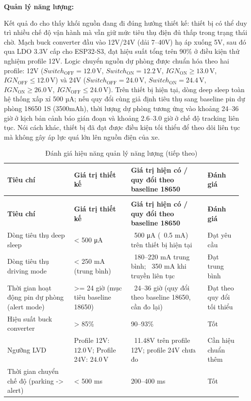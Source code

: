 \documentclass[a4paper]{extarticle}
\newcommand{\thesissettableid}[2]{%
  \renewcommand{\thetable}{#1}%
  \renewcommand{\theHtable}{#2}%
}
\begin{document}
\textbf{Quản lý năng lượng:}

Kết quả đo cho thấy khối nguồn đang đi đúng hướng thiết kế: thiết bị có
thể duy trì nhiều chế độ vận hành mà vẫn giữ mức tiêu thụ điện đủ thấp
trong trạng thái chờ. Mạch buck converter đầu vào 12V/24V (dải 7--40V)
hạ áp xuống 5V, sau đó qua LDO 3.3V cấp cho ESP32-S3, đạt hiệu suất tổng
trên 90\% ở điều kiện thử nghiệm profile 12V. Logic chuyển nguồn dự
phòng được chuẩn hóa theo hai profile:
12V (\(Switch_{\mathrm{OFF}} = 12.0\,\mathrm{V}\),
\(Switch_{\mathrm{ON}} = 12.2\,\mathrm{V}\),
\(IGN_{\mathrm{ON}} \ge 13.0\,\mathrm{V}\),
\(IGN_{\mathrm{OFF}} \le 12.0\,\mathrm{V}\)) và
24V (\(Switch_{\mathrm{OFF}} = 24.0\,\mathrm{V}\),
\(Switch_{\mathrm{ON}} = 24.4\,\mathrm{V}\),
\(IGN_{\mathrm{ON}} \ge 26.0\,\mathrm{V}\),
\(IGN_{\mathrm{OFF}} \le 24.0\,\mathrm{V}\)). Trên thiết bị hiện tại, dòng deep
sleep toàn hệ thống xấp xỉ 500 µA; nếu quy đổi cùng giả định tiêu thụ
sang baseline pin dự phòng 18650 1S (3500mAh), thời lượng dự phòng tương
ứng vào khoảng 24--36 giờ ở kịch bản cảnh báo gián đoạn và khoảng
2.6--3.0 giờ ở chế độ tracking liên tục. Nói cách khác, thiết bị đã đạt
được điều kiện tối thiểu để theo dõi liên tục mà không gây áp lực quá
lớn lên nguồn điện của xe.


{\thesissettableid{5.1}{tab-ch5-anh-gia-hieu-nang-quan-ly-nang-luong}
\def\LTcaptype{table}
\begin{longtable}{|L{0.272\linewidth}|L{0.231\linewidth}|L{0.311\linewidth}|L{0.141\linewidth}|}
\caption{Đánh giá hiệu năng quản lý năng lượng}\label{tab:ch5-anh-gia-hieu-nang-quan-ly-nang-luong}\\
\hline \textbf{Tiêu chí} & \textbf{Giá trị thiết kế} & \textbf{Giá trị hiện có / quy đổi theo baseline
18650} & \textbf{Đánh giá} \\
\hline
\endfirsthead
\caption[]{Đánh giá hiệu năng quản lý năng lượng (tiếp theo)}\\
\hline \textbf{Tiêu chí} & \textbf{Giá trị thiết kế} & \textbf{Giá trị hiện có / quy đổi theo baseline
18650} & \textbf{Đánh giá} \\
\hline
\endhead
\hline
\endfoot
\endlastfoot
Dòng tiêu thụ deep sleep & \textless{} 500 μA & ~500 μA
(~0.5 mA) trên thiết bị hiện tại & Đạt yêu cầu \\\hline
Dòng tiêu thụ driving mode & \textless{} 250 mA (trung bình) &
~180--220 mA trung bình; ~350 mA khi truyền
liên tục & Đạt trung bình \\\hline
Thời gian hoạt động pin dự phòng (alert mode) & \textgreater= 24 giờ
(mục tiêu baseline 18650) & ~24--36 giờ (quy đổi theo
baseline 18650, cần đo lại) & Đạt theo quy đổi tối thiểu \\\hline
Hiệu suất buck converter & \textgreater{} 85\% & 90--93\% & Tốt \\\hline
Ngưỡng LVD & Profile 12V: \(12.0\,\mathrm{V}\); Profile 24V: \(24.0\,\mathrm{V}\) &
~11.48V trên profile 12V; profile 24V chưa đo & Cần hiệu
chuẩn thêm \\\hline
Thời gian chuyển chế độ (parking -\textgreater{} alert) & \textless{}
500 ms & 200--400 ms & Tốt \\\hline
\end{longtable}
}
\end{document}
